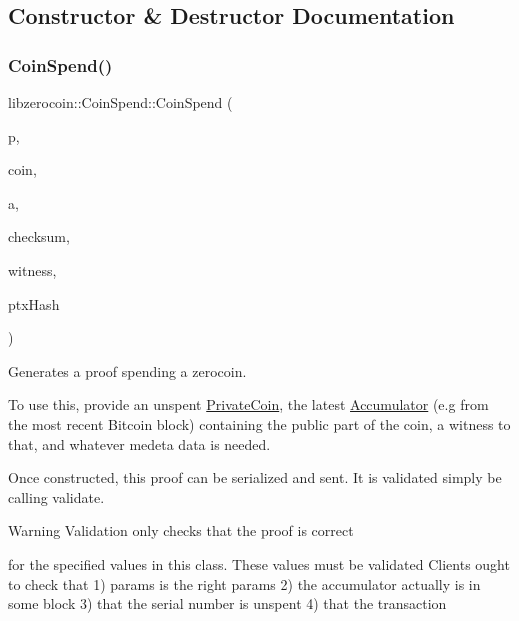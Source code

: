 \subsection{Constructor \& Destructor Documentation}
\mbox{\label{classlibzerocoin_1_1_coin_spend_ab26a001c08285be91ca2bf1d310d3cd6}} 
\subsubsection{\texorpdfstring{CoinSpend()}{CoinSpend()}}
{\footnotesize\ttfamily libzerocoin\+::\+Coin\+Spend\+::\+Coin\+Spend (\begin{DoxyParamCaption}\item[{const \mbox{\hyperlink{classlibzerocoin_1_1_zerocoin_params}{Zerocoin\+Params}} $\ast$}]{p,  }\item[{const \mbox{\hyperlink{classlibzerocoin_1_1_private_coin}{Private\+Coin}} \&}]{coin,  }\item[{\mbox{\hyperlink{classlibzerocoin_1_1_accumulator}{Accumulator}} \&}]{a,  }\item[{const uint32\+\_\+t}]{checksum,  }\item[{const \mbox{\hyperlink{classlibzerocoin_1_1_accumulator_witness}{Accumulator\+Witness}} \&}]{witness,  }\item[{const \mbox{\hyperlink{classuint256}{uint256}} \&}]{ptx\+Hash }\end{DoxyParamCaption})}

Generates a proof spending a zerocoin.

To use this, provide an unspent \mbox{\hyperlink{classlibzerocoin_1_1_private_coin}{Private\+Coin}}, the latest \mbox{\hyperlink{classlibzerocoin_1_1_accumulator}{Accumulator}} (e.\+g from the most recent Bitcoin block) containing the public part of the coin, a witness to that, and whatever medeta data is needed.

Once constructed, this proof can be serialized and sent. It is validated simply be calling validate. \begin{DoxyWarning}{Warning}
Validation only checks that the proof is correct 

for the specified values in this class. These values must be validated Clients ought to check that 1) params is the right params 2) the accumulator actually is in some block 3) that the serial number is unspent 4) that the transaction
\end{DoxyWarning}

